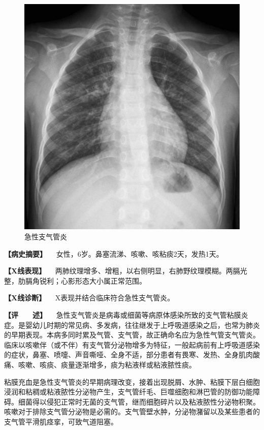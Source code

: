 \begin{figure}[!htbp]
 \centering
 \includegraphics{./images/Image00139.jpg}
 \captionsetup{justification=centering}
 \caption{急性支气管炎}
 \label{fig3-2-3}
  \end{figure} 

\textbf{【病史摘要】} 　女性，6岁。鼻塞流涕、咳嗽、咳粘痰2天，发热1天。

\textbf{【X线表现】}
　两肺纹理增多、增粗，以右侧明显，右肺野纹理模糊。两膈光整，肋膈角锐利；心影形态大小属正常范围。

\textbf{【X线诊断】} 　X表现并结合临床符合急性支气管炎。

\textbf{【评　　述】}
　急性支气管炎是病毒或细菌等病原体感染所致的支气管粘膜炎症。是婴幼儿时期的常见病、多发病，往往继发于上呼吸道感染之后，也常为肺炎的早期表现。本病多同时累及气管、支气管，故正确命名应为急性气管支气管炎。临床以咳嗽伴（或不伴）有支气管分泌物增多为特征，一般起病前有上呼吸道感染的症状，鼻塞、喷嚏、声音嘶哑、全身不适，部分患者有畏寒、发热、全身肌肉酸痛、咳嗽、咳痰、痰量逐渐增多，痰为粘液样或粘液脓性痰。

粘膜充血是急性支气管炎的早期病理改变，接着出现脱屑、水肿、粘膜下层白细胞浸润和粘稠或粘液脓性分泌物产生，支气管纤毛、巨噬细胞和淋巴管的防御功能障碍。细菌得以侵犯正常时无菌的支气管，继而细胞碎片以及粘液脓性分泌物积聚。咳嗽对于排除支气管分泌物是必需的。支气管壁水肿，分泌物潴留以及某些患者的支气管平滑肌痉挛，可致气道阻塞。

